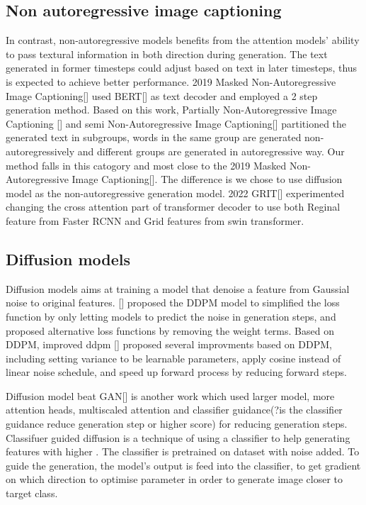 \documentclass{article}
\begin{document}
\subsection{Non autoregressive image captioning}
In contrast, non-autoregressive models benefits from the attention models' ability to pass textural information in both direction during generation. The text generated in former timesteps could adjust based on text in later timesteps, thus is expected to achieve better performance. 2019 Masked Non-Autoregressive Image Captioning[] used BERT[] as text decoder and employed a 2 step generation method. Based on this work, Partially Non-Autoregressive Image Captioning [] and semi Non-Autoregressive Image Captioning[] partitioned the generated text in subgroups, words in the same group are generated non-autoregressively and different groups are generated in autoregressive way. Our method falls in this catogory and most close to the 2019 Masked Non-Autoregressive Image Captioning[]. The difference is we chose to use diffusion model as the non-autoregressive generation model. 2022 GRIT[] experimented changing the cross attention part of transformer decoder to use both Reginal feature from Faster RCNN and Grid features from swin transformer. 

\subsection{Diffusion models}
Diffusion models aims at training a model that denoise a feature from Gaussial noise to original features.
[] proposed the DDPM model to simplified the loss function by only letting models to predict the noise in generation steps, and proposed alternative loss functions by removing the weight terms. Based on DDPM, improved ddpm [] proposed several improvments based on DDPM, including setting variance to be learnable parameters, apply cosine instead of linear noise schedule, and speed up forward process by reducing forward steps. 

Diffusion model beat GAN[] is another work which used larger model, more attention heads, multiscaled attention and classifier guidance(?is the classifier guidance reduce generation step or higher score) for reducing generation steps. Classifuer guided diffusion is a technique of using a classifier to help generating features with higher . The classifier is pretrained on dataset with noise added. To guide the generation, the model's output is feed into the classifier, to get gradient on which direction to optimise parameter in order to generate image closer to target class.
\end{document}
